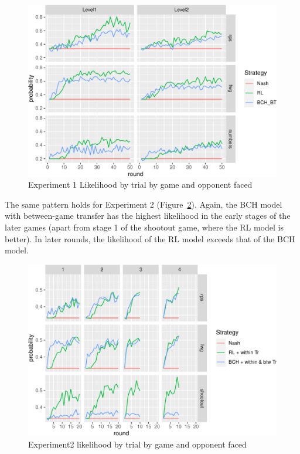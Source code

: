 \documentclass[
  english,
  man,floatsintext]{apa6}
\begin{document}
\begin{figure}

{\centering \includegraphics{paper_draft_2021_files/figure-latex/exp1-lik-by-tr-1} 

}

\caption{Experiment 1 Likelihood by trial by game and opponent faced}\label{fig:exp1-lik-by-tr}
\end{figure}

The same pattern holds for Experiment 2 (Figure~\ref{fig:exp2-lik-by-tr}). Again, the BCH model with between-game transfer has the highest likelihood in the early stages of the later games (apart from stage 1 of the shootout game, where the RL model is better). In later rounds, the likelihood of the RL model exceeds that of the BCH model.

\begin{figure}

{\centering \includegraphics{paper_draft_2021_files/figure-latex/exp2-lik-by-tr-1} 

}

\caption{Experiment2 likelihood by trial by game and opponent faced}\label{fig:exp2-lik-by-tr}
\end{figure}
\end{document}
